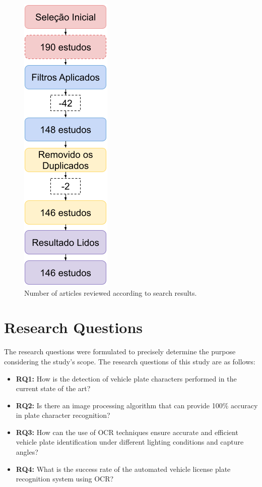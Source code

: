 \documentclass[conference]{IEEEtran}
\begin{document}
	\begin{figure}[htbp]
		\centerline{\includegraphics{img3.png}}
		\caption{Number of articles reviewed according to search results.}
		\label{img3}
	\end{figure}
	
	\section{Research Questions}
	
	The research questions were formulated to precisely determine the purpose considering the study's scope. The research questions of this study are as follows:
	
	\begin{itemize}
		\item \textbf{RQ1:} How is the detection of vehicle plate characters performed in the current state of the art?
		\item \textbf{RQ2:} Is there an image processing algorithm that can provide 100\% accuracy in plate character recognition?
		\item \textbf{RQ3:} How can the use of OCR techniques ensure accurate and efficient vehicle plate identification under different lighting conditions and capture angles?
		\item \textbf{RQ4:} What is the success rate of the automated vehicle license plate recognition system using OCR?
	\end{itemize}
	
\end{document}
